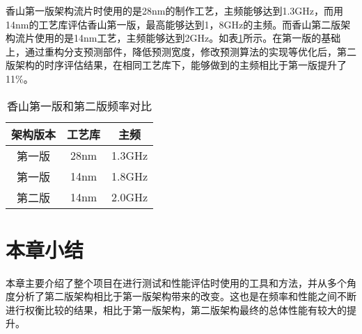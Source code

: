 香山第一版架构流片时使用的是28nm的制作工艺，主频能够达到1.3GHz，而用14nm的工艺库评估香山第一版，最高能够达到1，8GHz的主频。而香山第二版架构流片使用的是14nm工艺，主频能够达到2GHz。如表\ref{tb:table3}所示。在第一版的基础上，通过重构分支预测部件，降低预测宽度，修改预测算法的实现等优化后，第二版架构的时序评估结果，在相同工艺库下，能够做到的主频相比于第一版提升了11\%。

\begin{table}[!h]
	\caption{香山第一版和第二版频率对比}
	\label{tb:table3}
	\centering
	\begin{tabular}{|c|c|c|}
		\hline
		架构版本   & 工艺库   & 主频   \\ \hline
		第一版 & 28nm & 1.3GHz \\ \hline
		第一版 & 14nm & 1.8GHz \\ \hline
		第二版 & 14nm & 2.0GHz \\ \hline
	\end{tabular}
\end{table}


\section{本章小结}

本章主要介绍了整个项目在进行测试和性能评估时使用的工具和方法，并从多个角度分析了第二版架构相比于第一版架构带来的改变。这也是在频率和性能之间不断进行权衡比较的结果，相比于第一版架构，第二版架构最终的总体性能有较大的提升。